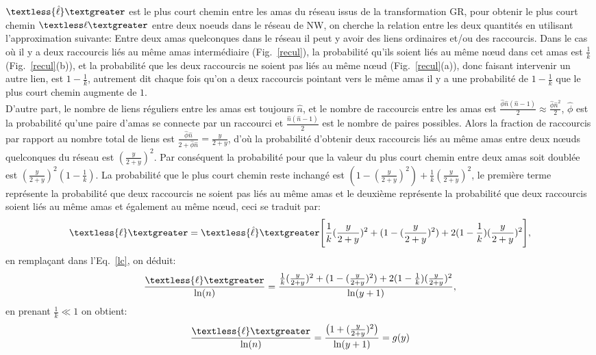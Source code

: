 $\textless {\hat\ell} \textgreater$ est le plus court chemin entre les \textsf{amas} du réseau issus de la transformation GR, pour obtenir le plus court chemin $\textless \ell \textgreater$ entre deux noeuds dans le réseau de NW, on cherche la relation entre les deux quantités en utilisant l'approximation suivante:
Entre deux \textsf{\textsf{amas}} quelconques dans le réseau il peut y avoir des liens ordinaires et/ou des raccourcis. Dans le cas où il y a deux raccourcis liés au m\^{e}me \textsf{\textsf{amas}} intermédiaire (Fig.~\ref{recul}), la probabilité qu'ils soient liés au m\^{e}me nœud dans cet \textsf{\textsf{amas}} est $\frac{1}{k}$ (Fig.~\ref{recul}(b)), et la probabilité que les deux raccourcis ne soient pas liés au m\^{e}me nœud (Fig.~\ref{recul}(a)), donc faisant intervenir un autre lien, est  $1-\frac{1}{k}$, autrement dit chaque fois qu'on a deux raccourcis pointant vers le même \textsf{amas} il y a une probabilité de $1-\frac{1}{k}$ que le plus court chemin augmente de $1$.\\
D'autre part, le nombre de liens réguliers entre les \textsf{\textsf{amas}} est toujours
$\hat{n}$, et le nombre de raccourcis entre les \textsf{\textsf{amas}} est $\frac{\hat{\phi}\hat{n}(\hat{n}-1)}{2}\approx\frac{\hat{\phi}\hat{n}^2}{2}$,
$\hat{\phi}$ est la probabilité qu'une paire d'\textsf{\textsf{amas}} se connecte par un raccourci et $\frac{\hat{n}(\hat{n}-1)}{2}$ est le nombre de paires possibles. Alors la fraction de raccourcis par rapport au nombre total de liens est $\frac{\hat{\phi}\hat{n}}{2+\hat{\phi}\hat{n}}=\frac{y}{2+y}$, d'où la probabilité d'obtenir deux raccourcis liés au m\^{e}me \textsf{\textsf{amas}} entre deux nœuds quelconques du réseau est $(\frac{y}{2+y})^2$. Par conséquent la probabilité pour que la valeur du plus court chemin entre deux \textsf{amas} soit doublée est $(\frac{y}{2+y})^2(1-\frac{1}{k})$. La probabilité que le plus court chemin reste inchangé est $(1-(\frac{y}{2+y})^2)+\frac{1}{k}(\frac{y}{2+y})^2$, le première terme représente la probabilité que deux raccourcis ne soient pas liés au m\^{e}me \textsf{\textsf{amas}} et le deuxième représente la probabilité 
que deux raccourcis soient liés au m\^{e}me \textsf{\textsf{amas}} et également au m\^{e}me nœud, ceci se traduit par: 
\begin{eqnarray}
\textless {\ell} \textgreater=\textless {\hat \ell} \textgreater \Bigg[\frac{1}{k}(\frac{y}{2+y})^2+(1-(\frac{y}{2+y})^2)+2(1-\frac{1}{k})(\frac{y}{2+y})^2\Bigg],
\end{eqnarray}
en remplaçant dans l'Eq.~\eqref{lc}, on déduit:
\begin{eqnarray}
\frac{\textless {\ell} \textgreater}{\ln(n)}=\frac{\frac{1}{k}(\frac{y}{2+y})^2+(1-(\frac{y}{2+y})^2)+2(1-\frac{1}{k})(\frac{y}{2+y})^2}{\ln(y+1)},
\end{eqnarray}
en prenant $\frac{1}{k}\ll1$ on obtient:
\begin{eqnarray}
\frac{\textless {\ell} \textgreater}{\ln(n)}=\frac{\big(1+(\frac{y}{2+y})^2\big)}{\ln(y+1)}=g(y)
\label{kp2}
\end{eqnarray}

